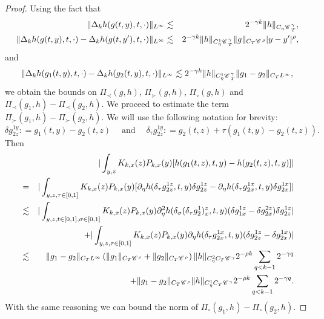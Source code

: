 \documentclass{amsart}
\newcommand{\tmop}[1]{\ensuremath{\operatorname{#1}}}
\theoremstyle{remark}
\theoremstyle{definition}
\newcommand{\CC}{\mathscr{C} \hspace{.1em}}
\begin{document}
\begin{proof}
  Using the fact that
  \begin{eqnarray*}
    \| \Delta_k h (g (t, y), t, \cdot) \|_{L^{\infty}} & \lesssim & 2^{-
    \gamma k} \| h \|_{C_{\eta} \CC_T^{\gamma}},\\
    \| \Delta_k h (g (t, y), t, \cdot) - \Delta_k h (g (t, y'), t, \cdot)
    \|_{L^{\infty}} & \lesssim & 2^{- \gamma k} \| h \|_{C_{\eta}^1
    \CC_T^{\gamma}} \| g \|_{C_T  \CC^{\rho}} | y - y' |^{\rho},
  \end{eqnarray*}
  and
  \[ \| \Delta_k h (g_1 (t, y), t, \cdot) - \Delta_k h (g_2 (t, y), t, \cdot)
     \|_{L^{\infty}} \lesssim 2^{- \gamma k} \| h \|_{C_{\eta}^1
     \CC_T^{\gamma}} \| g_1 - g_2 \|_{C_T L^{\infty}}, \]
  we obtain the bounds on $\Pi_{\prec} (g, h)$, $\Pi_{\succ} (g, h)$,
  $\Pi_{\circ} (g, h)$ and $\Pi_{\prec} (g_1, h) - \Pi_{\prec} (g_2, h)$. We
  proceed to estimate the term $\Pi_{\succ} (g_1, h) - \Pi_{\succ} (g_2, h)$.
  We will use the following notation for brevity:
  \[ \delta g_{2 z}^{1 y} : = g_1 (t, y) - g_2 (t, z) \quad \tmop{and} \quad
     \delta_{\tau} g_{2 z}^{1 y} : = g_2 (t, z) + \tau (g_1  (t, y) - g_2 (t,
     z)) . \]
  Then
  \begin{eqnarray*}
    &  & | \int_{y, z} K_{k, x} (z) P_{k, x} (y) [h (g_1 (t, z), t, y) - h
    (g_2 (t, z), t, y)] |\\
    & = & | \int_{y, z, \tau \in [0, 1]} K_{k, x} (z) P_{k, x} (y)
    [\partial_{\eta} h (\delta_{\tau} g_{2 z}^{1 z}, t, y) \delta g_{2 z}^{1
    z} - \partial_{\eta} h (\delta_{\tau} g_{2 x}^{1 x}, t, y) \delta g_{2
    x}^{1 x}] |\\
    & \lesssim & | \int_{y, z, t \in [0, 1], \sigma \in [0, 1]} K_{k, x} (z)
    P_{k, x} (y) \partial^2_{\eta} h (\delta_{\sigma} (\delta_{\tau}
    g_2^1)^z_x, t, y) (\delta g^{1 z}_{1 x} - \delta g^{2 z}_{2 x}) \delta
    g_{2 z}^{1 z} |\\
    &  & + | \int_{y, z, \tau \in [0, 1]} K_{k, x} (z) P_{k, x} (y)
    \partial_{\eta} h (\delta_{\tau} g_{2 x}^{1 x}, t, y) (\delta g_{2 z}^{1
    z} - \delta g_{2 x}^{1 x}) |\\
    & \lesssim & \| g_1 - g_2 \|_{C_T L^{\infty}} \left( \| g_1 \|_{C_T
    \CC^{\rho}} + \| g_2 \|_{C_T \CC^{\rho}} \right) \| h \|_{C_{\eta}^2 C_T
    \CC^{\gamma}} 2^{- \rho k} \sum_{q < k - 1} 2^{- \gamma q}\\
    &  & + \| g_1 - g_2 \|_{C_T \CC^{\rho}}  \| h \|_{C_{\eta}^1 C_T
    \CC^{\gamma}} 2^{- \rho k} \sum_{q < k - 1} 2^{- \gamma q} .
  \end{eqnarray*}
  With the same reasoning we can bound the norm of $\Pi_{\circ} (g_1, h) -
  \Pi_{\circ} (g_2, h)$.
\end{proof}
\end{document}
